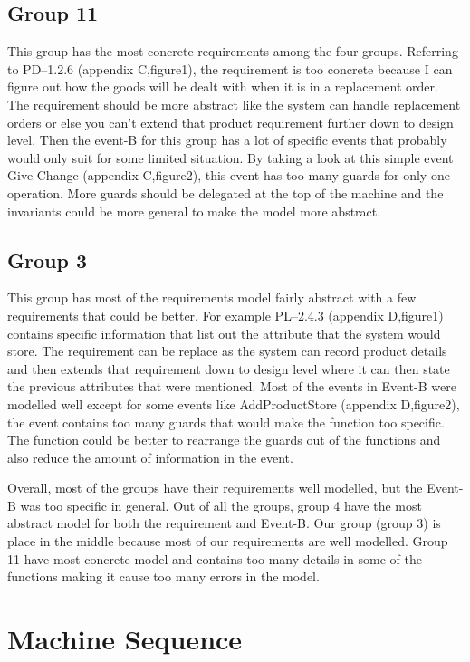 \subsection{Group 11}
\label{group11}

This group has the most concrete requirements among the four groups. Referring to PD--1.2.6 (appendix C,figure1), the requirement is too concrete because I can figure out how the goods will be dealt with when it is in a replacement order. The requirement should be more abstract like the system can handle replacement orders or else you can’t extend that product requirement further down to design level. Then the event-B for this group has a lot of specific events that probably would only suit for some limited situation. By taking a look at this simple event Give Change (appendix C,figure2), this event has too many guards for only one operation. More guards should be delegated at the top of the machine and the invariants could be more general to make the model more abstract. 

\subsection{Group 3}
\label{group3}

This group has most of the requirements model fairly abstract with a few requirements that could be better. For example PL--2.4.3 (appendix D,figure1) contains specific information that list out the attribute that the system would store. The requirement can be replace as the system can record product details and then extends that requirement down to design level where it can then state the previous attributes that were mentioned. Most of the events in Event-B were modelled well except for some events like AddProductStore (appendix D,figure2), the event contains too many guards that would make the function too specific. The function could be better to rearrange the guards out of the functions and also reduce the amount of information in the event. 

Overall, most of the groups have their requirements well modelled, but the Event-B was too specific in general. Out of all the groups, group 4 have the most abstract model for both the requirement and Event-B. Our group (group 3) is place in the middle because most of our requirements are well modelled. Group 11 have most concrete model and contains too many details in some of the functions making it cause too many errors in the model.

\section{Machine Sequence}
\label{machinesequence}

